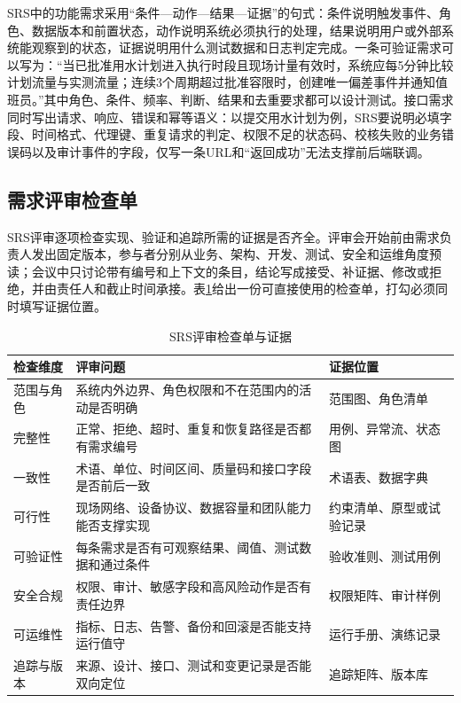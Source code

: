 SRS中的功能需求采用“条件—动作—结果—证据”的句式：条件说明触发事件、角色、数据版本和前置状态，动作说明系统必须执行的处理，结果说明用户或外部系统能观察到的状态，证据说明用什么测试数据和日志判定完成。一条可验证需求可以写为：“当已批准用水计划进入执行时段且现场计量有效时，系统应每5分钟比较计划流量与实测流量；连续3个周期超过批准容限时，创建唯一偏差事件并通知值班员。”其中角色、条件、频率、判断、结果和去重要求都可以设计测试。接口需求同时写出请求、响应、错误和幂等语义：以提交用水计划为例，SRS要说明必填字段、时间格式、代理键、重复请求的判定、权限不足的状态码、校核失败的业务错误码以及审计事件的字段，仅写一条URL和“返回成功”无法支撑前后端联调。

\subsection{需求评审检查单}

SRS评审逐项检查实现、验证和追踪所需的证据是否齐全。评审会开始前由需求负责人发出固定版本，参与者分别从业务、架构、开发、测试、安全和运维角度预读；会议中只讨论带有编号和上下文的条目，结论写成接受、补证据、修改或拒绝，并由责任人和截止时间承接。表\ref{tab:ch02-srs-review-checklist}给出一份可直接使用的检查单，打勾必须同时填写证据位置。

\begin{table}[htbp]
\centering
\caption{SRS评审检查单与证据}
\label{tab:ch02-srs-review-checklist}
\begin{tabular}{p{2.4cm}p{5.4cm}p{3.5cm}}
\toprule
检查维度 & 评审问题 & 证据位置 \\
\midrule
范围与角色 & 系统内外边界、角色权限和不在范围内的活动是否明确 & 范围图、角色清单 \\
完整性 & 正常、拒绝、超时、重复和恢复路径是否都有需求编号 & 用例、异常流、状态图 \\
一致性 & 术语、单位、时间区间、质量码和接口字段是否前后一致 & 术语表、数据字典 \\
可行性 & 现场网络、设备协议、数据容量和团队能力能否支撑实现 & 约束清单、原型或试验记录 \\
可验证性 & 每条需求是否有可观察结果、阈值、测试数据和通过条件 & 验收准则、测试用例 \\
安全合规 & 权限、审计、敏感字段和高风险动作是否有责任边界 & 权限矩阵、审计样例 \\
可运维性 & 指标、日志、告警、备份和回滚是否能支持运行值守 & 运行手册、演练记录 \\
追踪与版本 & 来源、设计、接口、测试和变更记录是否能双向定位 & 追踪矩阵、版本库 \\
\bottomrule
\end{tabular}
\end{table}


